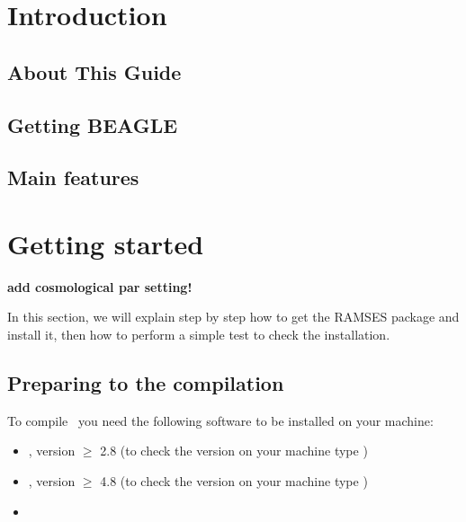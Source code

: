 \documentclass[a4paper,11pt,twoside]{article}
\begin{document}

   
   \cleardoublepage
   \tableofcontents


\section{Introduction}

\subsection{About This Guide}

\subsection{Getting BEAGLE}

\subsection{Main features}

\section{Getting started}

{\bf add cosmological par setting!}

In this section, we will explain step by step how to get the RAMSES
package and install it, then how to perform a simple test to check the
installation.

\subsection{Preparing to the compilation}

To compile \beagle\ you need the following software to be installed on your machine:

\begin{itemize}
	\item {}, version $\ge$ 2.8 (to check the version on your machine type )
	\item {}, version $\ge$ 4.8 (to check the version on your machine type )
	\item {}
\end{itemize}
\end{document}
